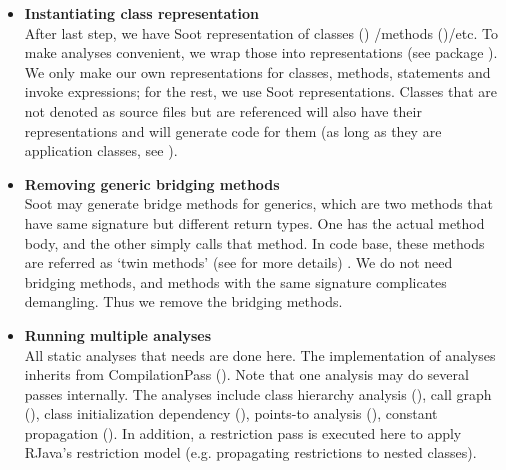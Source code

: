 \documentclass[12pt]{article}
\begin{document}
\begin{enumerate}
\begin{enumerate}
\begin{itemize}
    \item
    \textbf{Instantiating \rjc class representation\\}
    After last step, we have Soot representation of 
    classes ()
    /methods ()/etc. 
    To make analyses convenient, we wrap those into \rjc 
    representations (see package 
    ). 
	We only make our own representations for classes, 
	methods, 	statements and invoke expressions; for the rest,
	we use Soot representations. 
    Classes that are not denoted as source files but are 
    referenced will also have their \rjc representations
    and \rjc will generate code for them (as long as they are
    application classes, see ).

    \item
    \textbf{Removing generic bridging methods\\}
    Soot may generate bridge methods for generics, which are
    two methods that have same signature but different
    return types. One has the actual method body, and the
    other simply calls that method. 
    In \rjc code base, these methods are referred as 
    `twin methods' 
    (see  for more details)
    . We do not need bridging methods, and 
    methods with the same signature complicates demangling. 
    Thus we remove the bridging methods. 
    
    \item
    \textbf{Running multiple analyses\\}
    All static analyses that \rjc needs are done here. 
    The implementation of analyses inherits from
    CompilationPass ().
    Note that one analysis may do several passes internally. 
    The analyses include 
    class hierarchy analysis (),
    call graph (), 
    class initialization dependency (),
    points-to analysis (),
    constant propagation (). 
    In addition, a restriction pass is executed here to apply
    RJava's restriction model (e.g. propagating restrictions
    to nested classes). 
    
    \end{itemize}
  \end{enumerate}

\end{enumerate}
\end{document}
